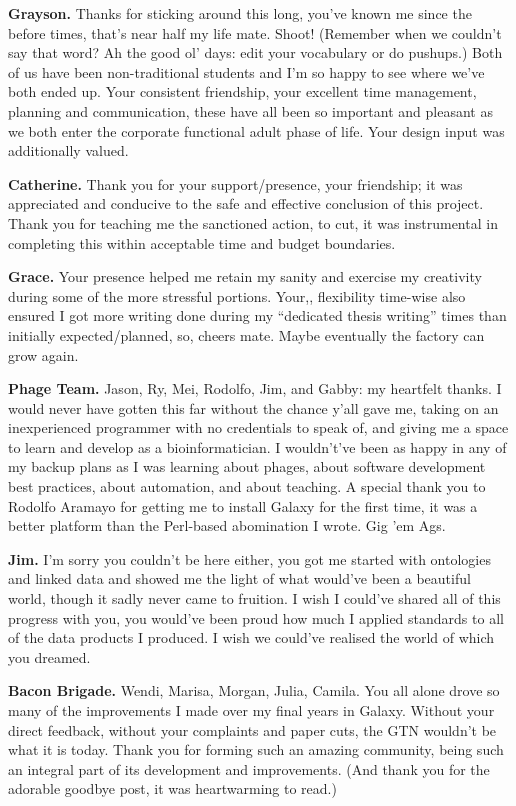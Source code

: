 \textbf{Grayson.} Thanks for sticking around this long, you've known me since the {\fontRedacted before} {\fontRedacted times}, that's near half my life mate. Shoot! (Remember when we couldn't say that word? Ah the good ol' days: edit your vocabulary or do pushups.) Both of us have been non-traditional students and I'm so happy to see where we've both ended up. Your consistent friendship, your excellent time management, planning and communication, these have all been so important and pleasant as we both enter the corporate functional adult phase of life. Your design input was additionally valued.

\textbf{Catherine.} Thank you for your support/presence, your friendship; it was appreciated and conducive to the safe and effective conclusion of this project. Thank you for teaching me the sanctioned action, to cut, it was instrumental in completing this within acceptable time and budget boundaries.

\textbf{Grace.} Your presence helped me retain my sanity and exercise my creativity during some of the more stressful portions. Your,, flexibility time-wise also ensured I got more writing done during my ``dedicated thesis writing'' times than initially expected/planned, so, cheers mate. Maybe eventually the factory can grow again.

\textbf{Phage Team.} Jason, Ry, Mei, Rodolfo, Jim, and Gabby: my heartfelt thanks. I would never have gotten this far without the chance y'all gave me, taking on an inexperienced programmer with no credentials to speak of, and giving me a space to learn and develop as a bioinformatician. I wouldn't've been as happy in any of my backup plans as I was learning about phages, about software development best practices, about automation, and about teaching. A special thank you to Rodolfo Aramayo for getting me to install Galaxy for the first time, it was a better platform than the Perl-based abomination I wrote. Gig 'em Ags.

\textbf{Jim.} I'm sorry you couldn't be here either, you got me started with ontologies and linked data and showed me the light of what would've been a beautiful world, though it sadly never came to fruition. I wish I could've shared all of this progress with you, you would've been proud how much I applied standards to all of the data products I produced. I wish we could've realised the world of which you dreamed.

\textbf{Bacon Brigade.} Wendi, Marisa, Morgan, Julia, Camila. You all alone drove so many of the improvements I made over my final years in Galaxy. Without your direct feedback, without your complaints and paper cuts, the GTN wouldn't be what it is today. Thank you for forming such an amazing community, being such an integral part of its development and improvements. (And thank you for the adorable goodbye post, it was heartwarming to read.)

